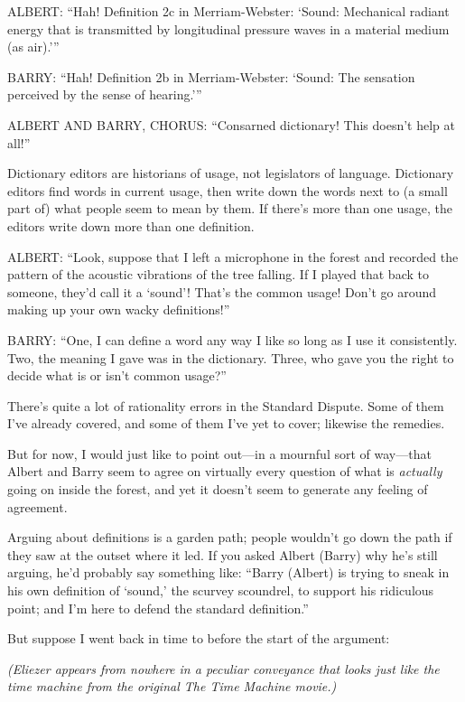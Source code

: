 {
 ALBERT: ``Hah! Definition 2c in Merriam-Webster:
`Sound: Mechanical radiant energy that is transmitted by
longitudinal pressure waves in a material medium (as
air).'''}

{
 BARRY: ``Hah! Definition 2b in Merriam-Webster:
`Sound: The sensation perceived by the sense of
hearing.'''}

{
 ALBERT AND BARRY, CHORUS: ``Consarned dictionary!
This doesn't help at all!''}

{
 Dictionary editors are historians of usage, not legislators of
language. Dictionary editors find words in current usage, then write
down the words next to (a small part of) what people seem to mean by
them. If there's more than one usage, the editors write
down more than one definition.}

{
 ALBERT: ``Look, suppose that I left a microphone
in the forest and recorded the pattern of the acoustic vibrations of
the tree falling. If I played that back to someone,
they'd call it a
`sound'! That's the
common usage! Don't go around making up your own wacky
definitions!''}

{
 BARRY: ``One, I can define a word any way I like
so long as I use it consistently. Two, the meaning I gave was in the
dictionary. Three, who gave you the right to decide what is or
isn't common usage?''}

{
 There's quite a lot of rationality errors in the
Standard Dispute. Some of them I've already covered,
and some of them I've yet to cover; likewise the
remedies.}

{
 But for now, I would just like to point out---in a mournful sort
of way---that Albert and Barry seem to agree on virtually every
question of what is \textit{actually} going on inside the forest, and
yet it doesn't seem to generate any feeling of
agreement.}

{
 Arguing about definitions is a garden path; people
wouldn't go down the path if they saw at the outset
where it led. If you asked Albert (Barry) why he's
still arguing, he'd probably say something like:
``Barry (Albert) is trying to sneak in his own
definition of `sound,' the scurvey
scoundrel, to support his ridiculous point; and I'm
here to defend the standard definition.''}

{
 But suppose I went back in time to before the start of the
argument:}

{
 \textit{(Eliezer appears from nowhere in a peculiar conveyance
that looks just like the time machine from the original The Time
Machine movie.)}}

